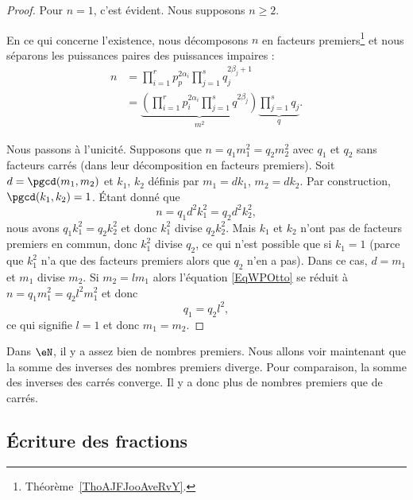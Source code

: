 \begin{proof}
    Pour \( n=1\), c'est évident. Nous supposons \( n\geq 2\).

    En ce qui concerne l'existence, nous décomposons \( n\) en facteurs premiers\footnote{Théorème~\ref{ThoAJFJooAveRvY}.} et nous séparons les puissances paires des puissances impaires :
    \begin{subequations}
        \begin{align}
            n&=\prod_{i=1}^rp_p^{2\alpha_i}\prod_{j=1}^sq_{j}^{2\beta_j+1}\\
            &=\underbrace{\left( \prod_{i=1}^rp_i^{2\alpha_i}\prod_{j=1}^sq^{2\beta_j} \right)}_{m^2}\underbrace{\prod_{j=1}^sq_j}_{q}.
        \end{align}
    \end{subequations}

    Nous passons à l'unicité. Supposons que \( n=q_1m_1^2=q_2m_2^2\) avec \( q_1\) et \( q_2\) sans facteurs carrés (dans leur décomposition en facteurs premiers). Soit \( d=\pgcd(m_1,m_2)\) et \( k_1\), \( k_2\) définis par \( m_1=dk_1\), \( m_2=dk_2\). Par construction, \( \pgcd(k_1,k_2)=1\). Étant donné que
    \begin{equation}        \label{EqWPOtto}
        n=q_1d^2k_1^2=q_2d^2k_2^2,
    \end{equation}
    nous avons \( q_1k_1^2=q_2k_2^2\) et donc \( k_1^2\) divise \( q_2k_2^2\). Mais \( k_1\) et \( k_2\) n'ont pas de facteurs premiers en commun, donc \( k_1^2\) divise \( q_2\), ce qui n'est possible que si \( k_1=1\) (parce que \( k_1^2\) n'a que des facteurs premiers alors que \( q_2\) n'en a pas). Dans ce cas, \( d=m_1\) et \( m_1\) divise \( m_2\). Si \( m_2=lm_1\) alors l'équation \eqref{EqWPOtto} se réduit à  \( n=q_1m_1^2=q_2l^2m_1^2\) et donc
    \begin{equation}
        q_1=q_2l^2,
    \end{equation}
    ce qui signifie \( l=1\) et donc \( m_1=m_2\).
\end{proof}

Dans \( \eN\), il y a assez bien de nombres premiers. Nous allons voir maintenant que la somme des inverses des nombres premiers diverge. Pour comparaison, la somme des inverses des carrés converge. Il y a donc plus de nombres premiers que de carrés.

\subsection{Écriture des fractions}

